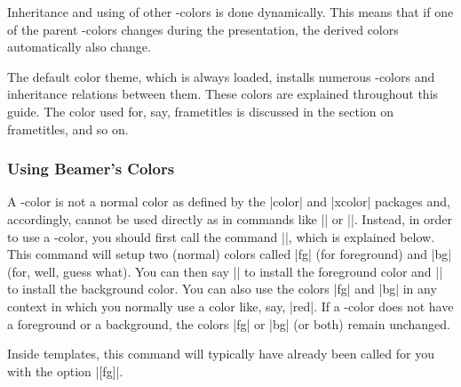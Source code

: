 Inheritance and using of other \beamer-colors is done
dynamically. This means that if one of the parent \beamer-colors
changes during the presentation, the derived colors automatically also
change.

The default color theme, which is always loaded, installs numerous
\beamer-colors and inheritance relations between them. These colors
are explained throughout this guide. The color used for, say,
frametitles is discussed in the section on frametitles, and so on.


\subsubsection{Using Beamer's Colors}

A \beamer-color is not a normal color as defined by the |color| and
|xcolor| packages and, accordingly, cannot be used directly as in
commands like |\color| or ||. Instead, in order to use a
\beamer-color, you should first call the command |\usebeamercolor|,
which is explained below. This command will setup two (normal) colors
called |fg| (for foreground) and |bg| (for, well, guess what). You can
then say |\color{fg}| to install the foreground color and
|\color{bg}| to install the background color. You can also use the
colors |fg| and |bg| in any context in which you normally use a color
like, say, |red|. If a \beamer-color does not have a foreground or a
background, the colors |fg| or |bg| (or both) remain unchanged.

Inside templates, this command will typically have already been called
for you with the option |[fg]|.

